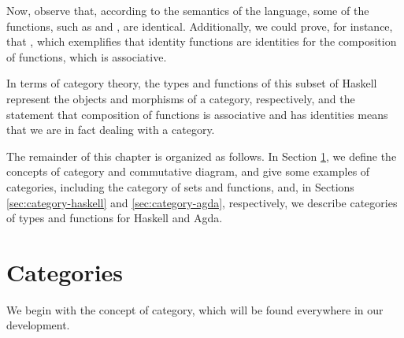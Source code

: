 Now, observe that, according to the semantics of the language, some of
the functions, such as  and
, are identical. Additionally, we could prove, for
instance, that , which
exemplifies that identity functions are identities for the composition
of functions, which is associative.

In terms of category theory, the types and functions of this subset of
Haskell represent the objects and morphisms of a category,
respectively, and the statement that composition of functions is
associative and has identities means that we are in fact dealing with
a category.

The remainder of this chapter is organized as follows. In Section
\ref{sec:categories}, we define the concepts of category and
commutative diagram, and give some examples of categories, including
the category of sets and functions, and, in Sections
\ref{sec:category-haskell} and \ref{sec:category-agda}, respectively,
we describe categories of types and functions for Haskell and Agda.

\section{Categories}
\label{sec:categories}

We begin with the concept of category, which will be found everywhere
in our development.

